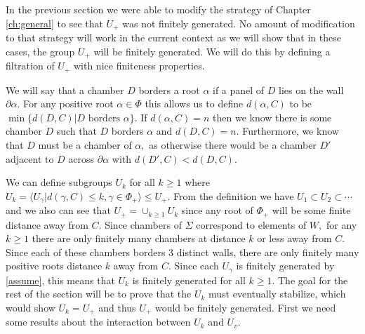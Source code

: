 \documentclass[class=book, crop=false]{standalone}
\begin{document}
In the previous section we were able to modify the strategy of Chapter \ref{ch:general} to see that $U_+$ was not finitely generated. No amount of modification to that strategy will work in the current context as we will show that in these cases, the group $U_+$ will be finitely generated. We will do this by defining a filtration of $U_+$ with nice finiteness properties.

We will say that a chamber $D$ borders a root $\alpha$ if a panel of $D$ lies on the wall $\partial \alpha.$ For any positive root $\alpha\in \Phi$ this allows us to define $d(\alpha,C)$ to be $\min\{d(D,C)|D\text{ borders }\alpha\}.$ If $d(\alpha,C)=n$ then we know there is some chamber $D$ such that $D$ borders $\alpha$ and $d(D,C)=n.$ Furthermore, we know that $D$ must be a chamber of $\alpha,$ as otherwise there would be a chamber $D'$ adjacent to $D$ across $\partial\alpha$ with $d(D',C)<d(D,C).$ 

	We can define subgroups $U_k$ for all $k\ge 1$ where $U_k=\langle U_\gamma|d(\gamma,C)\le k,\gamma\in \Phi_+\rangle\le U_+.$ From the definition we have $U_1\subset U_2\subset \cdots$ and we also can see that $U_+=\cup_{k\ge 1}U_k$ since any root of $\Phi_+$ will be some finite distance away from $C.$ Since chambers of $\Sigma$ correspond to elements of $W,$ for any $k\ge 1$ there are only finitely many chambers at distance $k$ or less away from $C.$ Since each of these chambers borders 3 distinct walls, there are only finitely many positive roots distance $k$ away from $C.$ Since each $U_\gamma$ is finitely generated by \eqref{assume}, this means that $U_k$ is finitely generated for all $k\ge 1.$ The goal for the rest of the section will be to prove that the $U_k$ must eventually stabilize, which would show $U_k=U_+$ and thus $U_+$ would be finitely generated. First we need some results about the interaction between $U_k$ and $U_v.$
\end{document}
